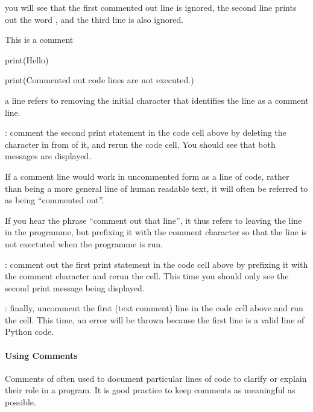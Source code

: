 \documentclass[letterpaper,10pt,english]{sphinxmanual}
\begin{document}
you will see that the first commented out line is ignored, the second line prints out the word , and the third line is also ignored.

{
\begin{sphinxVerbatim}[commandchars=\\\{\}]
\llap{\color{nbsphinxin}[ ]:\,\hspace{\fboxrule}\hspace{\fboxsep}}\PYGZsh{} This is a comment

print(\PYGZsq{}Hello\PYGZsq{})

\PYGZsh{}print(\PYGZdq{}Commented out code lines are not executed.\PYGZdq{})
\end{sphinxVerbatim}
}

 a line refers to removing the initial character that identifies the line as a comment line.

: comment the second print statement in the code cell above by deleting the \sphinxcode{\sphinxupquote{\#}} character in from of it, and rerun the code cell. You should see that both messages are displayed.

If a comment line would work in uncommented form as a line of code, rather than being a more general line of human readable text, it will often be referred to as being “commented out”.

If you hear the phrase “comment out that line”, it thus refers to leaving the line in the programme, but prefixing it with the comment character so that the line is not exectuted when the programme is run.

: comment out the first print statement in the code cell above by prefixing it with the \sphinxcode{\sphinxupquote{\#}} comment character and rerun the cell. This time you should only see the second print message being displayed.

: finally, uncomment the first (text comment) line in the code cell above and run the cell. This time, an error will be thrown because the first line is  a valid line of Python code.


\paragraph{Using Comments}
\label{\detokenize{content/01_Robot_Lab/Section_00_01:Using-Comments}}
Comments of often used to document particular lines of code to clarify or explain their role in a program. It is good practice to keep comments as meaningful as possible.
\end{document}
